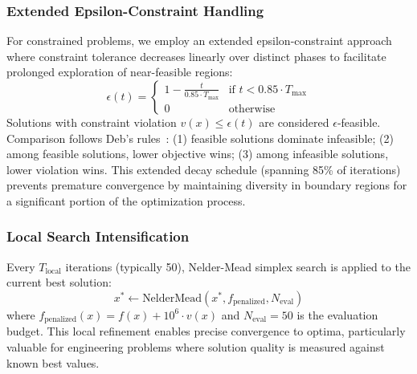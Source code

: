 \documentclass[11pt]{article}
\begin{document}
\subsubsection{Extended Epsilon-Constraint Handling}
For constrained problems, we employ an extended epsilon-constraint approach where constraint tolerance decreases linearly over distinct phases to facilitate prolonged exploration of near-feasible regions:
\begin{equation}
\epsilon(t) = 
\begin{cases} 
1 - \frac{t}{0.85 \cdot T_{\max}} & \text{if } t < 0.85 \cdot T_{\max} \\
0 & \text{otherwise}
\end{cases}
\end{equation}
Solutions with constraint violation $v(x) \leq \epsilon(t)$ are considered $\epsilon$-feasible. Comparison follows Deb's rules~\citep{deb2000efficient}: (1) feasible solutions dominate infeasible; (2) among feasible solutions, lower objective wins; (3) among infeasible solutions, lower violation wins. This extended decay schedule (spanning 85\% of iterations) prevents premature convergence by maintaining diversity in boundary regions for a significant portion of the optimization process.

\subsubsection{Local Search Intensification}
Every $T_{\text{local}}$ iterations (typically 50), Nelder-Mead simplex search is applied to the current best solution:
\begin{equation}
x^* \leftarrow \text{NelderMead}(x^*, f_{\text{penalized}}, N_{\text{eval}})
\end{equation}
where $f_{\text{penalized}}(x) = f(x) + 10^6 \cdot v(x)$ and $N_{\text{eval}} = 50$ is the evaluation budget. This local refinement enables precise convergence to optima, particularly valuable for engineering problems where solution quality is measured against known best values.
\end{document}
